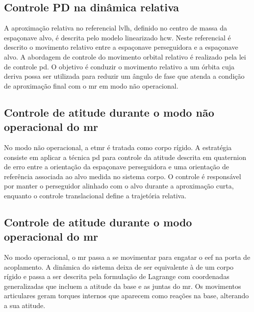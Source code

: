 
\subsection{Controle PD na dinâmica relativa}
\label{sec:controle_PD_HCW}

A aproximação relativa no referencial \gls{lvlh}, definido no centro de massa da espaçonave alvo, é descrita pelo modelo linearizado \gls{hcw}.
Neste referencial é descrito o movimento relativo entre a espaçonave perseguidora e a espaçonave alvo.
A abordagem de controle do movimento orbital relativo é realizado pela lei de controle \gls{pd}.
O objetivo é conduzir o movimento relativo a um órbita cuja deriva possa ser utilizada para reduzir um ângulo de fase que atenda a condição de aproximação final com o \gls{mr} em modo não operacional. 


\subsection{Controle de atitude durante o modo não operacional do \gls{mr}}
\label{sec:controle_atitude_Euler}

No modo não operacional, a \gls{etmr} é tratada como corpo rígido.
A estratégia consiste em aplicar a técnica \gls{pd} para controle da atitude descrita em quaternion de erro entre a orientação da espaçonave perseguidora e uma orientação de referência associada ao alvo medida no sistema corpo.
O controle é responsável por manter o perseguidor alinhado com o alvo durante a aproximação curta, enquanto o controle translacional define a trajetória relativa.


\subsection{Controle de atitude durante o modo operacional do \gls{mr}}
\label{sec:controle_atitude_Lagrange}
% 
No modo operacional, o \gls{mr} passa a se movimentar para engatar o \gls{eef} na porta de acoplamento.
A dinâmica do sistema deixa de ser equivalente à de um corpo rígido e passa a ser descrita pela formulação de Lagrange com coordenadas generalizadas que incluem a atitude da base e as juntas do \gls{mr}.
Os movimentos articulares geram torques internos que aparecem como reações na base, alterando a sua atitude.

